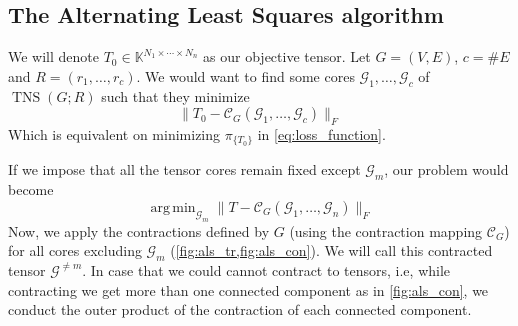\documentclass[11pt,a4paper,openright,oneside]{book}
\numberwithin{equation}{section}
\newcommand{\figref}[1]{\cref{#1}}
\DeclareMathOperator{\TNS}{TNS}
\DeclareMathOperator*{\argmin}{arg\,min}
\begin{document}
{\subsection{The Alternating Least Squares algorithm}

\nocite{malikSamplingBasedDecompositionAlgorithms2022a}

We will denote $T_0 \in \mathbb{K}^{N_1 \times \cdots \times N_n}$ as our objective tensor. Let $G = (V, E)$, $c = \#E$ and $R = (r_1, \dots, r_c)$.
We would want to find some cores
$\mathcal{G}_1, \dots, \mathcal{G}_c$ of $\TNS(G; R)$ such that they minimize
$$\|T_0 - \mathcal{C}_G (\mathcal{G}_1, \dots, \mathcal{G}_c)\|_F$$
Which is equivalent on minimizing $\pi_{\{T_0\}}$ in \eqref{eq:loss_function}.

If we impose that all the tensor cores remain fixed except $\mathcal{G}_m$, our problem would become
$$\argmin_{\mathcal{G}_m} \|T - \mathcal{C}_G(\mathcal{G}_1, \dots, \mathcal{G}_n)\|_F$$
Now, we apply the contractions defined by $G$ (using the contraction mapping $\mathcal{C}_G$) for all cores excluding $\mathcal{G}_m$ (\figref{fig:als_tr,fig:als_con}).
We will call this contracted tensor $\mathcal{G}^{\neq m}$. In case that we could cannot contract to tensors, i.e, while contracting we get
more than one connected component as in \figref{fig:als_con}, we conduct the outer product of the contraction of each connected component.

\begin{figure}[H]

    \centering
   \begin{minipage}{0\textwidth}
\end{minipage}
\end{figure}}
\end{document}
